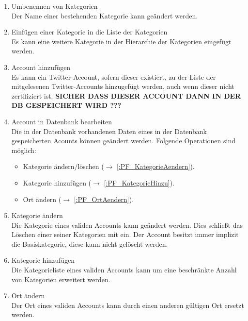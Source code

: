 \begin{enumerate}[ align=left, label={\textbf{\textbackslash F40\arabic*0\textbackslash}}]
	\item Umbenennen von Kategorien \label{:PF_KategorieUm} \\
	Der Name einer bestehenden Kategorie kann geändert werden.
	\item Einfügen einer Kategorie in die Liste der Kategorien  \label{:PF_KategorieHinzu} \\
	Es kann eine weitere Kategorie in der Hierarchie der Kategorien eingefügt werden.
	\item Account hinzufügen \label{:PF_AccountHinzu} \\
	Es kann ein Twitter-Account, sofern dieser existiert, zu der Liste der mitgelesenen Twitter-Accounts hinzugefügt werden, auch wenn dieser nicht zertifiziert ist.
	\textbf{SICHER DASS DIESER ACCOUNT DANN IN DER DB GESPEICHERT WIRD ???}
	\item Account in Datenbank bearbeiten \label{:PF_AccountBearbeiten} \\
	Die in der Datenbank vorhandenen Daten eines in der Datenbank gespeicherten Acounts können geändert werden. Folgende Operationen sind möglich:
	\begin{itemize}
		\item Kategorie ändern/löschen ($\rightarrow$ \ref{:PF_KategorieAendern}).
		\item Kategorie hinzufügen ($\rightarrow$ \ref{:PF_KategorieHinzu}).
		\item Ort ändern ($\rightarrow$ \ref{:PF_OrtAendern}).
	\end{itemize}
	\item Kategorie ändern \label{:PF_KategorieAendern} \\
	Die Kategorie eines validen Accounts kann geändert werden. Dies schließt das Löschen einer seiner Kategorien mit ein. Der Account besitzt immer implizit die Basiskategorie, diese kann nicht gelöscht werden.
	\item Kategorie hinzufügen \label{:PF_KategorieHinzu} \\
	Die Kategorieliste eines validen Accounts kann um eine beschränkte Anzahl von Kategorien erweitert werden. 
	\item Ort ändern \label{:PF_OrtAendern} \\
	Der Ort eines validen Accounts kann durch einen anderen gültigen Ort ersetzt werden.
\end{enumerate}

